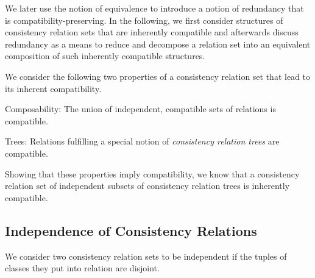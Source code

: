 We later use the notion of equivalence to introduce a notion of redundancy that is compatibility-preserving.
In the following, we first consider structures of consistency relation sets that are inherently compatible and afterwards discuss redundancy as a means to reduce and decompose a relation set into an equivalent composition of such inherently compatible structures.

We consider the following two properties of a consistency relation set that lead to its inherent compatibility.
\begin{properdescription}
    \item[Composability:] The union of independent, compatible sets of relations is compatible.
    \item[Trees:] Relations fulfilling a special notion of \emph{consistency relation trees} are compatible.
\end{properdescription}
Showing that these properties imply compatibility, we know that a consistency relation set of independent subsets of consistency relation trees is inherently compatible.


\subsection{Independence of Consistency Relations}
\label{chap:compatibility:formal_approach:independence}

We consider two consistency relation sets to be independent if the tuples of classes they put into relation are disjoint.


